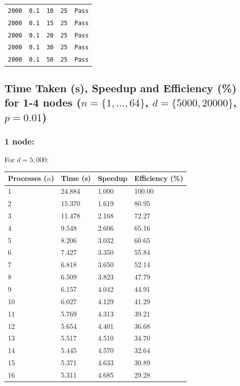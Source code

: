 \documentclass[11pt]{article}
\begin{document}
\begin{appendices}
{\begin{center}
\begin{tabular}{|l|l|l|l|l|}
\texttt{2000} & \texttt{0.1} & \texttt{10} & \texttt{25} & {\color{forestgreen!70}\texttt{Pass}}\\
\texttt{2000} & \texttt{0.1} & \texttt{15} & \texttt{25} & {\color{forestgreen!70}\texttt{Pass}}\\
\texttt{2000} & \texttt{0.1} & \texttt{20} & \texttt{25} & {\color{forestgreen!70}\texttt{Pass}}\\
\texttt{2000} & \texttt{0.1} & \texttt{30} & \texttt{25} & {\color{forestgreen!70}\texttt{Pass}}\\
\texttt{2000} & \texttt{0.1} & \texttt{50} & \texttt{25} & {\color{forestgreen!70}\texttt{Pass}}\\
\hline
\end{tabular}
\end{center}}
\newpage
{\color{darkindigo}
\subsection{Time Taken (s), Speedup and Efficiency (\%) for 1-4 nodes ($n=\{1,...,64\}$, $d=\{5000,20000\}$, $p=0.01$)}
\label{apdx:proctests}}
\subsubsection*{1 node:}
For $d=5,000$:
\footnotesize{
\begin{center}
\begin{tabular}{|l|l|l|l|}
\hline
Processes ($n$) & Time (s) & Speedup & Efficiency (\%)\\
\hline
1 & 24.884 & 1.000 & 100.00\\
2 & 15.370 & 1.619 & 80.95\\
3 & 11.478 & 2.168 & 72.27\\
4 & 9.548 & 2.606 & 65.16\\
5 & 8.206 & 3.032 & 60.65\\
6 & 7.427 & 3.350 & 55.84\\
7 & 6.818 & 3.650 & 52.14\\
8 & 6.509 & 3.823 & 47.79\\
9 & 6.157 & 4.042 & 44.91\\
10 & 6.027 & 4.129 & 41.29\\
11 & 5.769 & 4.313 & 39.21\\
12 & 5.654 & 4.401 & 36.68\\
13 & 5.517 & 4.510 & 34.70\\
14 & 5.445 & 4.570 & 32.64\\
15 & 5.371 & 4.633 & 30.89\\
16 & 5.311 & 4.685 & 29.28\\
\hline
\end{tabular}
\end{center}}


\end{appendices}
\end{document}

